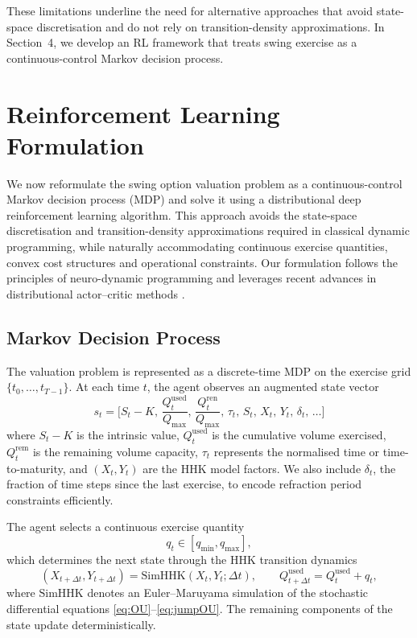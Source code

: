 \documentclass[a4paper,fleqn]{cas-dc}
\begin{document}
These limitations underline the need for alternative approaches that avoid state-space discretisation and do not rely on transition-density approximations. In Section~4, we develop an RL framework that treats swing exercise as a continuous-control Markov decision process.

\section{Reinforcement Learning Formulation}

We now reformulate the swing option valuation problem as a continuous-control Markov decision process (MDP) and solve it using a distributional deep reinforcement learning algorithm. This approach avoids the state-space discretisation and transition-density approximations required in classical dynamic programming, while naturally accommodating continuous exercise quantities, convex cost structures and operational constraints. Our formulation follows the principles of neuro-dynamic programming \cite{bertsekas1996neuro,sutton1998reinforcement} and leverages recent advances in distributional actor--critic methods \cite{dabney2018implicit,bellemare2017distributional}.

\subsection{Markov Decision Process}

The valuation problem is represented as a discrete-time MDP on the exercise grid $\{t_0,\dots,t_{T-1}\}$. At each time $t$, the agent observes an augmented state vector
\[
s_t
=
\Big[
S_t - K, \, 
\frac{Q^{\mathrm{used}}_t}{Q_{\max}}, \,
\frac{Q^{\mathrm{ren}}_t}{Q_{\max}}, \,
\tau_t, \,
S_t, \,
X_t, \,
Y_t, \,
\delta_t, \,
\dots
\Big]
\]
where $S_t - K$ is the intrinsic value, $Q^{\mathrm{used}}_t$ is the cumulative volume exercised, $Q^{\mathrm{rem}}_t$ is the remaining volume capacity, $\tau_t$ represents the normalised time or time-to-maturity, and $(X_t, Y_t)$ are the HHK model factors. We also include $\delta_t$, the fraction of time steps since the last exercise, to encode refraction period constraints efficiently.

The agent selects a continuous exercise quantity
\[
q_t \in [q_{\min}, q_{\max}],
\]
which determines the next state through the HHK transition dynamics
\[
(X_{t+\Delta t}, Y_{t+\Delta t}) 
= 
\text{SimHHK}(X_t, Y_t; \Delta t),
\qquad
Q^{\mathrm{used}}_{t+\Delta t}
=
Q^{\mathrm{used}}_t + q_t,
\]
where $\text{SimHHK}$ denotes an Euler–Maruyama simulation of the stochastic differential equations \eqref{eq:OU}--\eqref{eq:jumpOU}. The remaining components of the state update deterministically.
\end{document}
